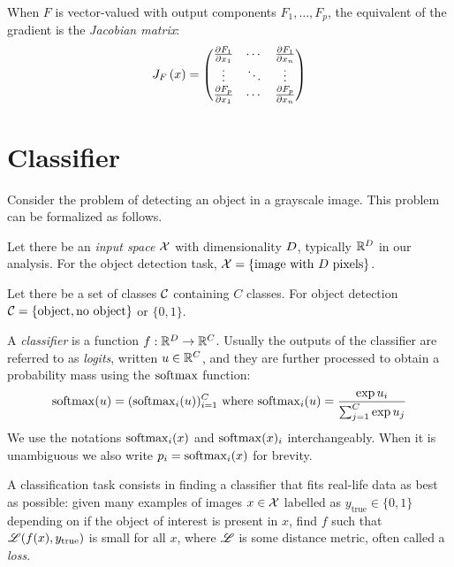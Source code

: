 \documentclass[../main.tex]{subfiles}
\begin{document}
When $F$ is vector-valued with output components $F_1, \ldots, F_p$, the equivalent of the gradient is the \emph{Jacobian matrix}:
\begin{align*}
    J_{F} \left( x \right) =
    \begin{pmatrix}
        \frac{\partial F_1}{\partial x_1} & \cdots  & \frac{\partial F_1}{\partial x_n} \\
        \vdots         & \ddots  & \vdots         \\
        \frac{\partial F_p}{\partial x_1} & \cdots  & \frac{\partial F_p}{\partial x_n}
    \end{pmatrix}
\end{align*}

\section{Classifier}

Consider the problem of detecting an object in a grayscale image. This problem can be formalized as follows.

Let there be an \emph{input space} $\mathcal{X}$ with dimensionality $D$, typically $\mathbb{R}^D$ in our analysis.
For the object detection task, $\mathcal{X} = \{\text{image with $D$ pixels}\}$.

Let there be a set of classes $\mathcal{C}$ containing $C$ classes. For object detection $\mathcal{C} = \{\text{object}, \text{no object}\}$ or $\{0, 1\}$.

A \emph{classifier} is a function $f: \mathbb{R}^D \to \mathbb{R}^C$.
Usually the outputs of the classifier are referred to as \emph{logits}, written $u \in \mathbb{R}^C$,
and they are further processed to obtain a probability mass using the $\mathrm{softmax}$ function:
\begin{equation}
    \mathrm{softmax}(u) = (\mathrm{softmax}_i(u))_{i=1}^{C} \text{ where }
    \mathrm{softmax}_i(u) = \frac{\exp u_i}{\sum_{j=1}^{C} \exp u_j}
\end{equation}
We use the notations $\mathrm{softmax}_i(x)$ and $\mathrm{softmax}(x)_i$ interchangeably.
When it is unambiguous we also write $p_i = \mathrm{softmax}_i(x)$ for brevity.

A classification task consists in finding a classifier that fits real-life data as best as possible:
given many examples of images $x \in \mathcal{X}$ labelled as $y_\text{true} \in \{0, 1\}$ depending on if the object
of interest is present in $x$, find $f$ such that
$\mathscr{L}(f(x), y_\text{true})$ is small for all $x$, where $\mathscr{L}$ is some distance metric, often called a \emph{loss}.
\end{document}
